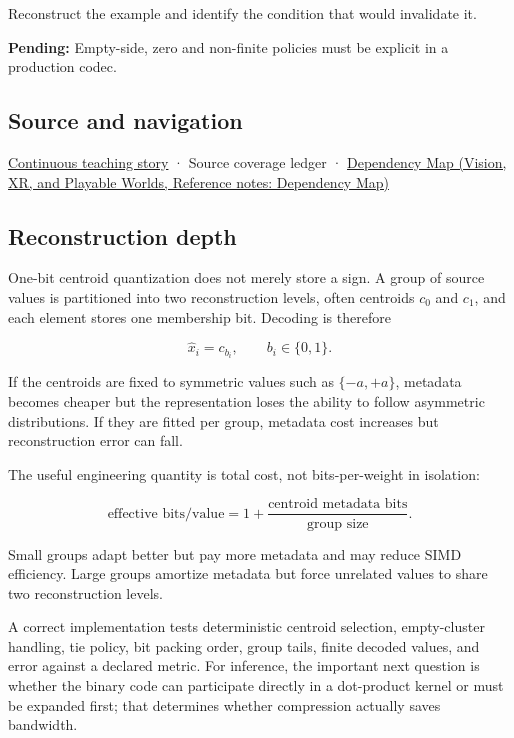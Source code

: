 Reconstruct the example and identify the condition that would invalidate it.

\textbf{Pending:} Empty-side, zero and non-finite policies must be explicit in a production codec.

\subsection{Source and navigation}\label{appendix-4ccd7a775813-source-and-navigation}

\hyperref[01-foundations-i-ch001-choosing-what-information-to-keep]{Continuous teaching story} · {Source coverage ledger} · \href{../07-Vision-XR-and-Playable-Worlds/main.pdf\#nameddest=appendix-4ad47bdd269a}{Dependency Map (Vision, XR, and Playable Worlds, Reference notes: Dependency Map)}

\subsection{Reconstruction depth}\label{appendix-4ccd7a775813-reconstruction-depth}

One-bit centroid quantization does not merely store a sign. A group of source values is partitioned into two reconstruction levels, often centroids \(c_0\) and \(c_1\), and each element stores one membership bit. Decoding is therefore

\[
\hat x_i = c_{b_i},
\qquad b_i\in\{0,1\}.
\]

If the centroids are fixed to symmetric values such as \(\{-a,+a\}\), metadata becomes cheaper but the representation loses the ability to follow asymmetric distributions. If they are fitted per group, metadata cost increases but reconstruction error can fall.

The useful engineering quantity is total cost, not bits-per-weight in isolation:

\[
\text{effective bits/value}
=
1 + \frac{\text{centroid metadata bits}}{\text{group size}}.
\]

Small groups adapt better but pay more metadata and may reduce SIMD efficiency. Large groups amortize metadata but force unrelated values to share two reconstruction levels.

A correct implementation tests deterministic centroid selection, empty-cluster handling, tie policy, bit packing order, group tails, finite decoded values, and error against a declared metric. For inference, the important next question is whether the binary code can participate directly in a dot-product kernel or must be expanded first; that determines whether compression actually saves bandwidth.
